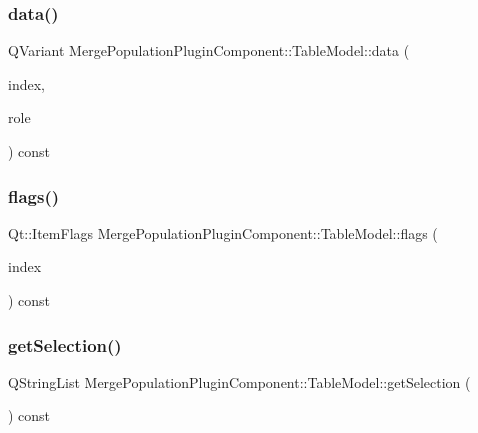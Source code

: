 \subsubsection{\texorpdfstring{data()}{data()}}
{\footnotesize\ttfamily Q\+Variant Merge\+Population\+Plugin\+Component\+::\+Table\+Model\+::data (\begin{DoxyParamCaption}\item[{const Q\+Model\+Index \&}]{index,  }\item[{int}]{role }\end{DoxyParamCaption}) const}

\mbox{\label{class_merge_population_plugin_component_1_1_table_model_a66ad29a0328e86269f45d045ef4a3c96}} 
\subsubsection{\texorpdfstring{flags()}{flags()}}
{\footnotesize\ttfamily Qt\+::\+Item\+Flags Merge\+Population\+Plugin\+Component\+::\+Table\+Model\+::flags (\begin{DoxyParamCaption}\item[{const Q\+Model\+Index \&}]{index }\end{DoxyParamCaption}) const}

\mbox{\label{class_merge_population_plugin_component_1_1_table_model_a9a7558301c9b16f82cbcaa716bb2c182}} 
\subsubsection{\texorpdfstring{getSelection()}{getSelection()}}
{\footnotesize\ttfamily Q\+String\+List Merge\+Population\+Plugin\+Component\+::\+Table\+Model\+::get\+Selection (\begin{DoxyParamCaption}{ }\end{DoxyParamCaption}) const}

